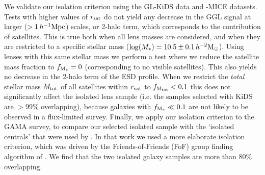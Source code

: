 \documentclass[usenatbib]{mnras}
\newcommand{\hmsun}{\,h^{-2} {\rm M_\odot}}
\newcommand{\hMpc}{\, h^{-1}{\rm{Mpc}} }
\newcommand{\un}[1]{_{\rm #1}}
\begin{document}
We validate our isolation criterion using the GL-KiDS data and -MICE datasets. Tests with higher values of $r\un{sat}$ do not yield any decrease in the GGL signal at larger ($>1\hMpc$) scales, or 2-halo term, which corresponds to the contribution of satellites. This is true both when all lens masses are considered, and when they are restricted to a specific stellar mass ($\log(M_*)=10.5\pm0.1\hmsun$). Using lenses with this same stellar mass we perform a test where we reduce the satellite mass fraction to $f\un{M_*}=0$ (corresponding to no visible satellites). This also yields no decrease in the 2-halo term of the ESD profile. When we restrict the \emph{total} stellar mass $M\un{tot}$ of all satellites within $r\un{sat}$ to $f\un{M\un{tot}}<0.1$ this does not significantly affect the isolated lens sample (i.e. the samples selected with KiDS are $>99\%$ overlapping), because galaxies with $f\un{M_*}\ll0.1$ are not likely to be observed in a flux-limited survey. Finally, we apply our isolation criterion to the GAMA survey, to compare our selected isolated sample with the `isolated centrals' that were used by \cite{brouwer2017}. In that work we used a more elaborate isolation criterion, which was driven by the Friends-of-Friends (FoF) group finding algorithm of \cite{robotham2011lenscat}. We find that the two isolated galaxy samples are more than $80\%$ overlapping.
\end{document}
